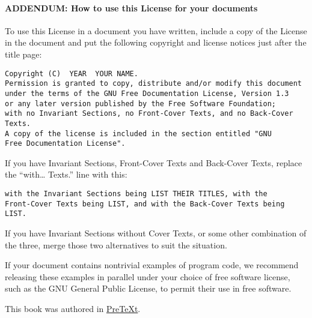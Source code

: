 \documentclass[10pt,]{book}
\theoremstyle{plain}
\theoremstyle{definition}
\theoremstyle{definition}
\theoremstyle{definition}
\theoremstyle{definition}
\numberwithin{equation}{section}
\begin{document}
\paragraph[{ADDENDUM: How to use this License for your documents}]{ADDENDUM: How to use this License for your documents}\hypertarget{gfdl-addendum}{}
To use this License in a document you have written, include a copy of the License in the document and put the following copyright and license notices just after the title page:%
\begin{verbatim}
Copyright (C)  YEAR  YOUR NAME.
Permission is granted to copy, distribute and/or modify this document
under the terms of the GNU Free Documentation License, Version 1.3
or any later version published by the Free Software Foundation;
with no Invariant Sections, no Front-Cover Texts, and no Back-Cover Texts.
A copy of the license is included in the section entitled "GNU
Free Documentation License".
\end{verbatim}
\par
If you have Invariant Sections, Front-Cover Texts and Back-Cover Texts, replace the ``with\dots{} Texts.'' line with this:%
\begin{verbatim}
with the Invariant Sections being LIST THEIR TITLES, with the
Front-Cover Texts being LIST, and with the Back-Cover Texts being LIST.
\end{verbatim}
\par
If you have Invariant Sections without Cover Texts, or some other combination of the three, merge those two alternatives to suit the situation.%
\par
If your document contains nontrivial examples of program code, we recommend releasing these examples in parallel under your choice of free software license, such as the GNU General Public License, to permit their use in free software.%
%
\backmatter
%
\cleardoublepage
\pagestyle{empty}
\centerline{This book was authored in \href{http://mathbook.pugetsound.edu}{PreTeXt}.%
}
\end{document}

